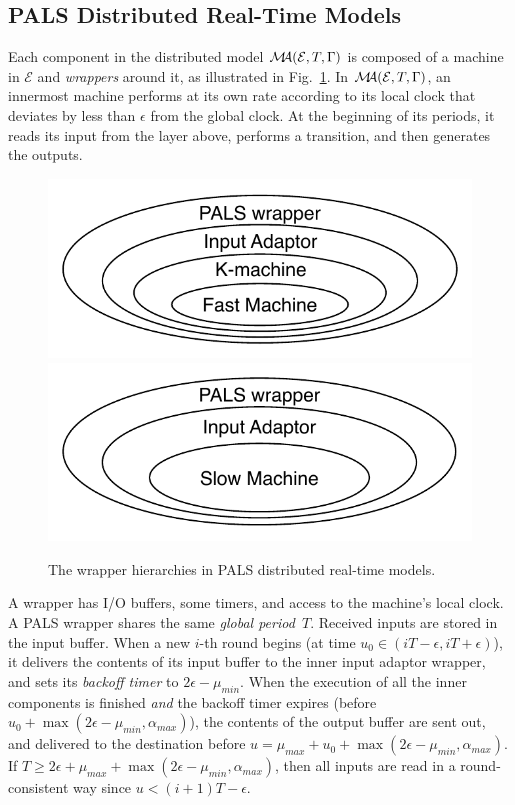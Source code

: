 \subsection{PALS Distributed  Real-Time Models}
\label{pals-dist}

Each component in the  distributed model $\mathcal{M}\!\!\mathcal{A}(\mathcal{E}, T, \Gamma)$
is composed of a machine in $\mathcal{E}$ and \emph{wrappers} around it, as illustrated in Fig.~\ref{fig:wrappers}.
In $\mathcal{M}\!\!\mathcal{A}(\mathcal{E}, T, \Gamma)$,
an innermost machine performs at its own rate according to its local clock
that deviates by less than $\epsilon$ from the global  clock.
At the beginning of its periods, it reads its input from the layer above, 
performs a transition, and then generates the outputs.

\begin{figure}
\centering
\includegraphics[width=0.49\columnwidth,clip=true,trim=0.3cm 0.3cm 0.3cm 0.3cm]{Onion-f.pdf}
\hfill
\includegraphics[width=0.49\columnwidth,clip=true,trim=0.3cm 0.3cm 0.3cm 0.3cm]{Onion-s.pdf}
\caption{The wrapper hierarchies %
in PALS distributed real-time  models.}
\label{fig:wrappers}
\end{figure}


%
A wrapper has I/O buffers, some timers, and access to the machine's  local clock.
A PALS wrapper %
shares the same \emph{global period~$T$}.
Received inputs are stored in the input buffer.
When a new $i$-th round begins %
(at time $u_0 \in (iT-\epsilon, iT+\epsilon)$),
it delivers the contents of its input buffer to the inner input adaptor wrapper,
and sets its \emph{backoff timer} to $2\epsilon -\mu_{min}$.
When the execution of all the inner components is finished \emph{and}
the backoff timer expires (before $u_0 + \max(2\epsilon -\mu_{min}, \alpha_{max})$),
the contents of the output buffer are sent out, %
and delivered to the destination before $u = \mu_{max} + u_0 +  \max(2\epsilon -\mu_{min}, \alpha_{max})$.
If $T\geq 2\epsilon + \mu_{max} + \max(2\epsilon -\mu_{min}, \alpha_{max})$,
then all inputs are read in a round-consistent way since $u < (i+1)T - \epsilon$.



